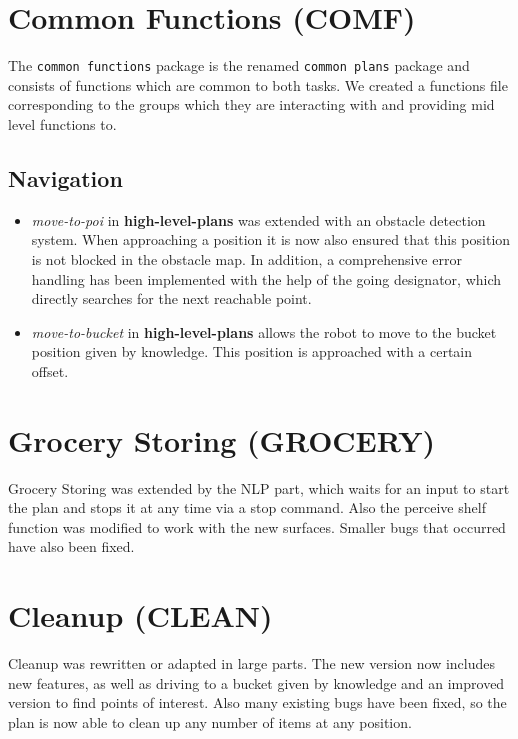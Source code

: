 \documentclass[main.tex]{subfiles}
\begin{document}
                \section{Common Functions (COMF)}
	                The \texttt{common functions} package is the renamed \texttt{common plans} package and consists of functions which are common to both tasks. We created a functions file corresponding to the groups which they are interacting with and providing mid level functions to.
	               
                \subsection{Navigation}
                  \begin{itemize}
                    \item \textit{move-to-poi} in \textbf{high-level-plans} was extended with an obstacle detection system. When approaching a position it is now also ensured that this position is not blocked in the obstacle map. In addition, a comprehensive error handling has been implemented with the help of the going designator, which directly searches for the next reachable point.
                    
                     \item \textit{move-to-bucket} in \textbf{high-level-plans} allows the robot to move to the bucket position given by knowledge. This position is approached with a certain offset.
                  \end{itemize}
                
                \section{Grocery Storing (GROCERY)}
                Grocery Storing was extended by the NLP part, which waits for an input to start the plan and stops it at any time via a stop command. Also the perceive shelf function was modified to work with the new surfaces. Smaller bugs that occurred have also been fixed.
                
                \section{Cleanup (CLEAN)}
                Cleanup was rewritten or adapted in large parts. The new version now includes new features, as well as driving to a bucket given by knowledge and an improved version to find points of interest. Also many existing bugs have been fixed, so the plan is now able to clean up any number of items at any position.
                

	
\end{document}

